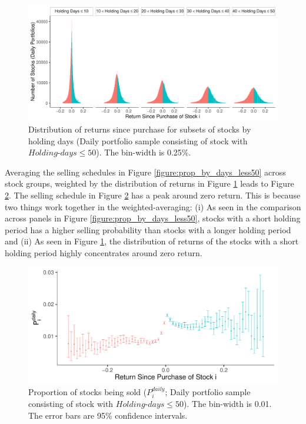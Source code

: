 \documentclass[11pt, a4paper]{article}
\begin{document}
\begin{figure}[H]
	\centering
	\includegraphics[width=1\columnwidth]{barc_hist_return_daily_less50_3.pdf}
	\caption{\small Distribution of returns since purchase for subsets of stocks by holding days (Daily portfolio sample consisting of stock with $Holding\mbox{-}days\leq50$). The bin-width is 0.25\%.}
	\label{figure:dist_ret_by_days_less50}
\end{figure}


Averaging the selling schedules in Figure \ref{figure:prop_by_days_less50} across stock groups, weighted by the distribution of returns in Figure \ref{figure:dist_ret_by_days_less50} leads to Figure \ref{figure:prop_less50}. 
The selling schedule in Figure \ref{figure:prop_less50} has a peak around zero return. This is because two things work together in the weighted-averaging: (i) As seen in the comparison across panels in Figure \ref{figure:prop_by_days_less50}, stocks with a short holding period has a higher selling probability than stocks with a longer holding period and (ii) As seen in Figure \ref{figure:dist_ret_by_days_less50}, the distribution of returns of the stocks with a short holding period highly concentrates around zero return. 

\begin{figure}[H]
	\centering
	\includegraphics[width=0.8\columnwidth]{barc_schedule_daily_less50_3.pdf}
	\caption{\small Proportion of stocks being sold ($P^{daily}_{i}$; Daily portfolio sample consisting of stock with $Holding\mbox{-}days\leq50$). The bin-width is 0.01. The error bars are 95\% confidence intervals.}
	\label{figure:prop_less50}
\end{figure}
\end{document}
